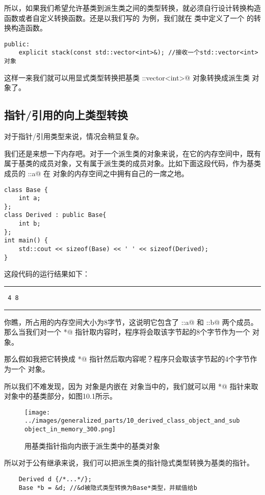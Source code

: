 所以，如果我们希望允许基类到派生类之间的类型转换，就必须自行设计转换构造函数或者自定义转换函数。还是以我们写的 \lstinline@stack@ 为例，我们就在 \lstinline@stack@ 类中定义了一个 \lstinline@explicit@ 的转换构造函数。
\begin{lstlisting}
public:
    explicit stack(const std::vector<int>&); //接收一个std::vector<int>对象
\end{lstlisting}
这样一来我们就可以用显式类型转换把基类 \lstinline@std::vector<int>@ 对象转换成派生类 \lstinline@stack@ 对象了。\par
\subsection*{指针/引用的向上类型转换}
对于指针/引用类型来说，情况会稍显复杂。\par
我们还是来想一下内存吧。对于一个派生类的对象来说，在它的内存空间中，既有属于基类的成员对象，又有属于派生类的成员对象。比如下面这段代码，作为基类成员的 \lstinline@Base::a@ 在 \lstinline@Derive@ 对象的内存空间之中拥有自己的一席之地。
\begin{lstlisting}
class Base {
    int a;
};
class Derived : public Base{
    int b;
};
int main() {
    std::cout << sizeof(Base) << ' ' << sizeof(Derived);
}
\end{lstlisting}
这段代码的运行结果如下：\\\noindent\rule{\linewidth}{.2pt}\texttt{
4 8
}\\\noindent\rule{\linewidth}{.2pt}\par
你瞧，\lstinline@Derived@ 所占用的内存空间大小为8字节，这说明它包含了 \lstinline@Base::a@ 和 \lstinline@Derived::b@ 两个成员。那么当我们对一个 \lstinline@Derived*@ 指针取内容时，程序将会取该字节起的8个字节作为一个 \lstinline@Derived@ 对象。\par
那么假如我把它转换成 \lstinline@Base*@ 指针然后取内容呢？程序只会取该字节起的4个字节作为一个 \lstinline@Base@ 对象。\par
所以我们不难发现，因为 \lstinline@Base@ 对象是内嵌在 \lstinline@Derived@ 对象当中的，我们就可以用 \lstinline@Base*@ 指针来取 \lstinline@Derived@ 对象中的基类部分，如图10.1所示。
\begin{figure}[htbp]
    \centering
    \texttt{[image: ../images/generalized\_parts/10\_derived\_class\_object\_and\_subobject\_in\_memory\_300.png]}
    \caption{用基类指针指向内嵌于派生类中的基类对象}
\end{figure}
所以对于公有继承来说，我们可以把派生类的指针隐式类型转换为基类的指针。
\begin{lstlisting}
    Derived d {/*...*/};
    Base *b = &d; //&d被隐式类型转换为Base*类型，并赋值给b
\end{lstlisting}\par
